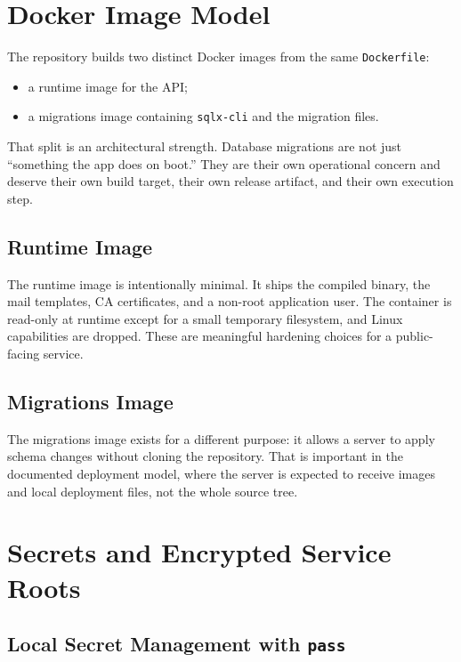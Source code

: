 \documentclass[11pt,a4paper]{article}
\begin{document}
\section{Docker Image Model}

The repository builds two distinct Docker images from the same \texttt{Dockerfile}:

\begin{itemize}
  \item a runtime image for the API;
  \item a migrations image containing \texttt{sqlx-cli} and the migration files.
\end{itemize}

That split is an architectural strength. Database migrations are not just ``something the app does on boot.'' They are their own operational concern and deserve their own build target, their own release artifact, and their own execution step.

\subsection{Runtime Image}

The runtime image is intentionally minimal. It ships the compiled binary, the mail templates, CA certificates, and a non-root application user. The container is read-only at runtime except for a small temporary filesystem, and Linux capabilities are dropped. These are meaningful hardening choices for a public-facing service.

\subsection{Migrations Image}

The migrations image exists for a different purpose: it allows a server to apply schema changes without cloning the repository. That is important in the documented deployment model, where the server is expected to receive images and local deployment files, not the whole source tree.

\section{Secrets and Encrypted Service Roots}

\subsection{Local Secret Management with \texttt{pass}}
\end{document}
